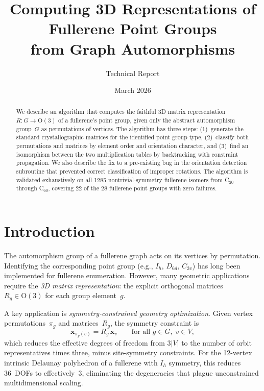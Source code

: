 \documentclass[11pt]{article}
\title{Computing 3D Representations of Fullerene Point Groups\\
  from Graph Automorphisms}
\author{Technical Report}
\date{March 2026}
\begin{document}
\maketitle

\begin{abstract}
We describe an algorithm that computes the faithful 3D matrix
representation $R : G \to \mathrm{O}(3)$ of a fullerene's point group,
given only the abstract automorphism group~$G$ as permutations of
vertices.  The algorithm has three steps: (1)~generate the standard
crystallographic matrices for the identified point group type,
(2)~classify both permutations and matrices by element order and
orientation character, and (3)~find an isomorphism between the two
multiplication tables by backtracking with constraint propagation.  We
also describe the fix to a pre-existing bug in the orientation detection
subroutine that prevented correct classification of improper rotations.
The algorithm is validated exhaustively on all 1285 nontrivial-symmetry
fullerene isomers from C$_{20}$ through C$_{60}$, covering 22 of the 28
fullerene point groups with zero failures.
\end{abstract}

\section{Introduction}
\label{sec:intro}

The automorphism group of a fullerene graph acts on its vertices by
permutation.  Identifying the corresponding point group (e.g., $I_h$,
$D_{6d}$, $C_{3v}$) has long been implemented for fullerene enumeration.
However, many geometric applications require the \emph{3D matrix
representation}: the explicit orthogonal matrices $R_g \in \mathrm{O}(3)$
for each group element~$g$.

A key application is \emph{symmetry-constrained geometry optimization}.
Given vertex permutations~$\pi_g$ and matrices~$R_g$, the symmetry
constraint is
\begin{equation}
  \label{eq:sym-constraint}
  \mathbf{x}_{\pi_g(v)} = R_g \, \mathbf{x}_v
  \qquad \text{for all } g \in G, \; v \in V,
\end{equation}
which reduces the effective degrees of freedom from $3|V|$ to the number
of orbit representatives times three, minus site-symmetry constraints.
For the 12-vertex intrinsic Delaunay polyhedron of a fullerene with
$I_h$ symmetry, this reduces 36~DOFs to effectively~3, eliminating the
degeneracies that plague unconstrained multidimensional scaling.
\end{document}
